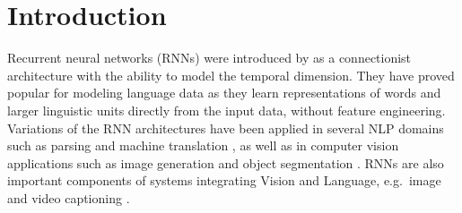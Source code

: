 \begin{abstract}
%
 
 
\end{abstract}

\section{Introduction}
\label{sec:intro}
Recurrent neural networks (RNNs) were introduced by
as a connectionist architecture with the
ability to model the temporal dimension. They have proved popular for
modeling language data as they learn representations of words and
larger linguistic units directly from the input data, without feature
engineering. Variations of the RNN architectures have been applied in
several NLP domains such as parsing \cite{vinyals2015grammar} and
machine translation \cite{bahdanau2014neural}, as well as in computer
vision applications such as image generation \cite{gregor2015draw} and
object segmentation \cite{visin2015reseg}. RNNs are also important
components of systems integrating Vision and Language, e.g.\ image
\cite{karpathy2015deep} and video captioning \cite{yu2015video}.

